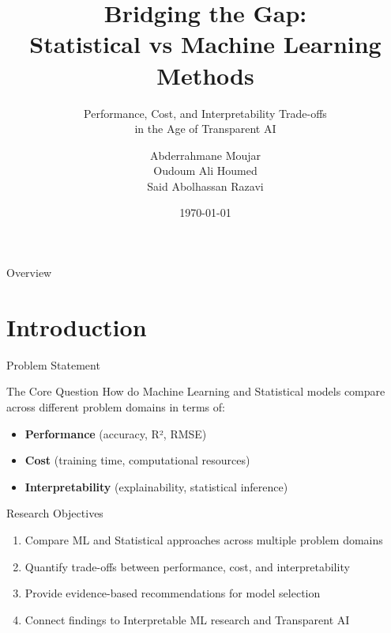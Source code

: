 \documentclass[aspectratio=169,10pt]{beamer}
\title[ML vs Statistical Models]{Bridging the Gap:\\Statistical vs Machine Learning Methods}
\subtitle{Performance, Cost, and Interpretability Trade-offs\\in the Age of Transparent AI}
\author{Abderrahmane Moujar \\ Oudoum Ali Houmed \\ Said Abolhassan Razavi }
\institute{Master Paris-Saclay\\Applied Statistics}
\date{\today}
\begin{document}
\begin{frame}
\titlepage
\end{frame}

\begin{frame}{Overview}
\tableofcontents
\end{frame}

\section{Introduction}

\begin{frame}{Problem Statement}
\begin{block}{The Core Question}
How do Machine Learning and Statistical models compare across different problem domains in terms of:
\begin{itemize}
    \item \textcolor{mlcolor}{\textbf{Performance}} (accuracy, R², RMSE)
    \item \textcolor{statcolor}{\textbf{Cost}} (training time, computational resources)
    \item \textcolor{accentcolor}{\textbf{Interpretability}} (explainability, statistical inference)
\end{itemize}
\end{block}

\vspace{0.3cm}

\begin{block}{Research Objectives}
\begin{enumerate}
    \item Compare ML and Statistical approaches across multiple problem domains
    \item Quantify trade-offs between performance, cost, and interpretability
    \item Provide evidence-based recommendations for model selection
    \item Connect findings to Interpretable ML research and Transparent AI
\end{enumerate}
\end{block}

\vspace{0.3cm}


\end{frame}
\end{document}

